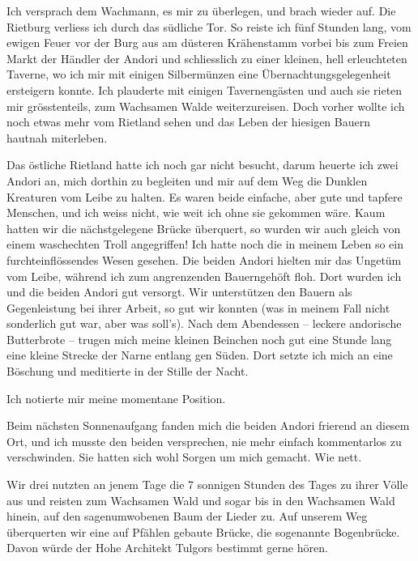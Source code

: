 Ich versprach dem Wachmann, es mir zu überlegen, und brach wieder auf. Die Rietburg verliess ich durch das südliche Tor. So reiste ich fünf Stunden lang, vom ewigen Feuer vor der Burg aus am düsteren Krähenstamm vorbei bis zum Freien Markt der Händler der Andori und schliesslich zu einer kleinen, hell erleuchteten Taverne, wo ich mir mit einigen Silbermünzen eine Übernachtungsgelegenheit ersteigern konnte. Ich plauderte mit einigen Tavernengästen und auch sie rieten mir grösstenteils, zum Wachsamen Walde weiterzureisen. Doch vorher wollte ich noch etwas mehr vom Rietland sehen und das Leben der hiesigen Bauern hautnah miterleben.

Das östliche Rietland hatte ich noch gar nicht besucht, darum heuerte ich zwei Andori an, mich dorthin zu begleiten und mir auf dem Weg die Dunklen Kreaturen vom Leibe zu halten. Es waren beide einfache, aber gute und tapfere Menschen, und ich weiss nicht, wie weit ich ohne sie gekommen wäre. Kaum hatten wir die nächstgelegene Brücke überquert, so wurden wir auch gleich von einem waschechten Troll angegriffen! Ich hatte noch die in meinem Leben so ein furchteinflössendes Wesen gesehen. Die beiden Andori hielten mir das Ungetüm vom Leibe, während ich zum angrenzenden Bauerngehöft floh. Dort wurden ich und die beiden Andori gut versorgt. Wir unterstützen den Bauern als Gegenleistung bei ihrer Arbeit, so gut wir konnten (was in meinem Fall nicht sonderlich gut war, aber was soll’s). Nach dem Abendessen – leckere andorische Butterbrote – trugen mich meine kleinen Beinchen noch gut eine Stunde lang eine kleine Strecke der Narne entlang gen Süden. Dort setzte ich mich an eine Böschung und meditierte in der Stille der Nacht.

Ich notierte mir meine momentane Position.



\trennzeichen



Beim nächsten Sonnenaufgang fanden mich die beiden Andori frierend an diesem Ort, und ich musste den beiden versprechen, nie mehr einfach kommentarlos zu verschwinden. Sie hatten sich wohl Sorgen um mich gemacht. Wie nett.

Wir drei nutzten an jenem Tage die 7 sonnigen Stunden des Tages zu ihrer Völle aus und reisten zum Wachsamen Wald und sogar bis in den Wachsamen Wald hinein, auf den sagenumwobenen Baum der Lieder zu. Auf unserem Weg überquerten wir eine auf Pfählen gebaute Brücke, die sogenannte Bogenbrücke. Davon würde der Hohe Architekt Tulgors bestimmt gerne hören.

